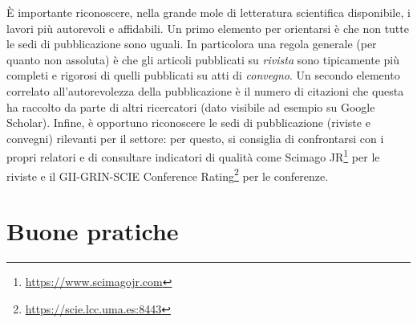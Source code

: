 \documentclass[12pt]{report}
\begin{document}
\`E importante riconoscere, nella grande mole di letteratura scientifica disponibile, i lavori pi\`u autorevoli e affidabili. Un primo elemento per orientarsi \`e che non tutte le sedi di pubblicazione sono uguali. In particolora una regola generale (per quanto non assoluta) \`e che gli articoli pubblicati su {\em rivista} sono tipicamente pi\`u completi e rigorosi di quelli pubblicati su atti di {\em convegno}. Un secondo elemento correlato all'autorevolezza della pubblicazione \`e il numero di citazioni che questa ha raccolto da parte di altri ricercatori (dato visibile ad esempio su Google Scholar). Infine, \`e opportuno riconoscere le sedi di pubblicazione (riviste e convegni) rilevanti per il settore: per questo, si consiglia di confrontarsi con i propri relatori e di consultare indicatori di qualità come Scimago JR\footnote{\url{https://www.scimagojr.com}} per le riviste e il GII-GRIN-SCIE Conference Rating\footnote{\url{https://scie.lcc.uma.es:8443}} per le conferenze.

\section{Buone pratiche}
\end{document}
